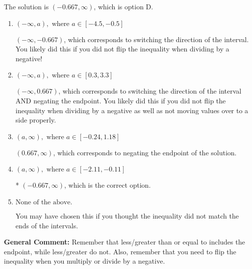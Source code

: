 \documentclass{extbook}[14pt]
\begin{document}
\begin{enumerate}
{The solution is \( (-0.667, \infty) \), which is option D.\begin{enumerate}[label=\Alph*.]
\item \( (-\infty, a), \text{ where } a \in [-4.5, -0.5] \)

 $(-\infty, -0.667)$, which corresponds to switching the direction of the interval. You likely did this if you did not flip the inequality when dividing by a negative!
\item \( (-\infty, a), \text{ where } a \in [0.3, 3.3] \)

 $(-\infty, 0.667)$, which corresponds to switching the direction of the interval AND negating the endpoint. You likely did this if you did not flip the inequality when dividing by a negative as well as not moving values over to a side properly.
\item \( (a, \infty), \text{ where } a \in [-0.24, 1.18] \)

 $(0.667, \infty)$, which corresponds to negating the endpoint of the solution.
\item \( (a, \infty), \text{ where } a \in [-2.11, -0.11] \)

* $(-0.667, \infty)$, which is the correct option.
\item \( \text{None of the above}. \)

You may have chosen this if you thought the inequality did not match the ends of the intervals.
\end{enumerate}

\textbf{General Comment:} Remember that less/greater than or equal to includes the endpoint, while less/greater do not. Also, remember that you need to flip the inequality when you multiply or divide by a negative.
}
\end{enumerate}
\end{document}
